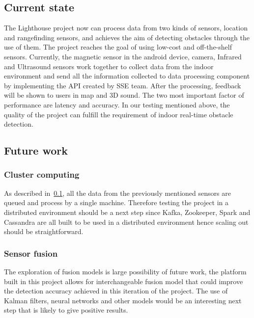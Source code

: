 \documentclass[prodmode,acmtosem]{acmsmall} %
\begin{document}
\subsection{Current state}
\label{sec:current}
The Lighthouse project now can process data from two kinds of sensors, location and rangefinding sensors, and achieves the aim of detecting obstacles through the use of them. The project reaches the goal of using low-cost and off-the-shelf sensors. Currently, the magnetic sensor in the android device, camera, Infrared and Ultrasound sensors work together to collect data from the indoor environment and send all the information collected to data processing component by implementing the API created by SSE team. After the processing, feedback will be shown to users in map and 3D sound. The two most important factor of performance are latency and accuracy. In our testing mentioned above, the quality of the project can fulfill the requirement of indoor real-time obstacle detection.

\subsection{Future work}

\subsubsection{Cluster computing}
As described in~\ref{sec:current}, all the data from the previously mentioned sensors are queued and process by a single machine. Therefore testing the project in a distributed environment should be a next step since Kafka, Zookeeper, Spark and Cassandra are all built to be used in a distributed environment hence scaling out should be straightforward. 

\subsubsection{Sensor fusion}
The exploration of fusion models is large possibility of future work, the platform built in this project allows for interchangeable fusion model that could improve the detection accuracy achieved in this iteration of the project. The use of Kalman filters, neural networks and other models would be an interesting next step that is likely to give positive results.
\end{document}
